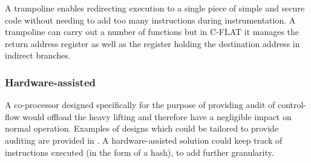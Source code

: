 A trampoline enables redirecting execution to a single piece of simple and secure code without needing to add too many instructions during instrumentation. A trampoline can carry out a number of functions but in C-FLAT \cite{Abera2016} it manages the return address register as well as the register holding the destination address in indirect branches. 

\subsubsection{Hardware-assisted}

A co-processor designed specifically for the purpose of providing audit of control-flow would offload the heavy lifting and therefore have a negligible impact on normal operation. Examples of designs which could be tailored to provide auditing are provided in \cite{DeClercq2017}. A hardware-assisted solution could keep track of instructions executed (in the form of a hash), to add further granularity.